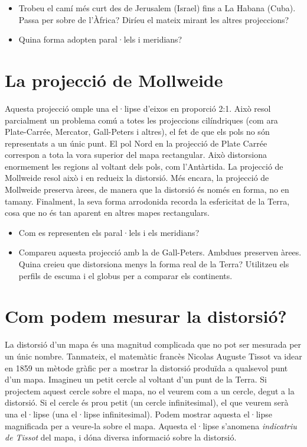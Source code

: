 \documentclass[a4paper,12pt]{article}
\begin{document}
\begin{itemize}
 \item Trobeu el camí més curt des de Jerusalem (Israel) fins a La Habana (Cuba). Passa per sobre de l'Àfrica? Diríeu el mateix mirant les altres projeccions?
 \item Quina forma adopten paral·lels i meridians?
\end{itemize}





\newpage
\section{La projecció de Mollweide}
Aquesta projecció omple una el·lipse d'eixos en proporció 2:1. Això resol parcialment un problema comú a totes les projeccions cilíndriques (com ara Plate-Carrée, Mercator, Gall-Peters i altres), el fet de que els pols no són representats a un únic punt. El pol Nord en la projecció de Plate Carrée correspon a tota la vora superior del mapa rectangular. Això distorsiona enormement les regions al voltant dels pols, com l'Antàrtida. La projecció de Mollweide resol això i en redueix la distorsió. Més encara, la projecció de Mollweide preserva àrees, de manera que la distorsió és només en forma, no en tamany. Finalment, la seva forma arrodonida recorda la esfericitat de la Terra, cosa que no és tan aparent en altres mapes rectangulars.


\begin{itemize}
 \item Com es representen els paral·lels i els meridians?
 
 
  \item Compareu aquesta projecció amb la de Gall-Peters. Ambdues preserven àrees. Quina creieu que distorsiona menys la forma real de la Terra? Utilitzeu els perfils de escuma i el globus per a comparar els continents.
  
\end{itemize}



\newpage
\section{Com podem mesurar la distorsió?}
La distorsió d'un mapa és una magnitud complicada que no pot ser mesurada per un únic nombre. Tanmateix, el matemàtic francès Nicolas Auguste Tissot va idear en 1859 un mètode gràfic per a mostrar la distorsió produïda a qualsevol punt d'un mapa. Imagineu un petit cercle al voltant d'un punt de la Terra. Si projectem aquest cercle sobre el mapa, no el veurem com a un cercle, degut a la distorsió. Si el cercle és prou petit (un cercle infinitesimal), el que veurem serà una el·lipse (una el·lipse infinitesimal). Podem mostrar aquesta el·lipse magnificada per a veure-la sobre el mapa. Aquesta el·lipse s'anomena \emph{indicatriu de Tissot} del mapa, i dóna diversa informació sobre la distorsió.
\end{document}
